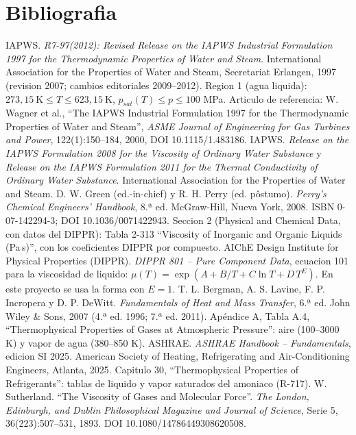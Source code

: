 \documentclass[11pt,a4paper]{article}
\begin{document}
\section{Bibliografia}
\begin{enumerate}[label={[\arabic*]}, leftmargin=1.6em]
 IAPWS. \emph{R7-97(2012): Revised Release on the IAPWS Industrial Formulation 1997 for the Thermodynamic Properties of Water and Steam}. International Association for the Properties of Water and Steam, Secretariat Erlangen, 1997 (revision 2007; cambios editoriales 2009--2012). Region 1 (agua liquida): $273{,}15\ \mathrm{K} \le T \le 623{,}15\ \mathrm{K}$, $p_{sat}(T) \le p \le 100$ MPa. Articulo de referencia: W. Wagner et al., ``The IAPWS Industrial Formulation 1997 for the Thermodynamic Properties of Water and Steam'', \emph{ASME Journal of Engineering for Gas Turbines and Power}, 122(1):150--184, 2000, DOI 10.1115/1.483186.
 IAPWS. \emph{Release on the IAPWS Formulation 2008 for the Viscosity of Ordinary Water Substance} y \emph{Release on the IAPWS Formulation 2011 for the Thermal Conductivity of Ordinary Water Substance}. International Association for the Properties of Water and Steam.
 D. W. Green (ed.-in-chief) y R. H. Perry (ed. p\^ostumo). \emph{Perry's Chemical Engineers' Handbook}, 8.ª ed. McGraw-Hill, Nueva York, 2008. ISBN 0-07-142294-3; DOI 10.1036/0071422943. Seccion 2 (Physical and Chemical Data, con datos del DIPPR): Tabla 2-313 ``Viscosity of Inorganic and Organic Liquids (Pa\,s)'', con los coeficientes DIPPR por compuesto.
 AIChE Design Institute for Physical Properties (DIPPR). \emph{DIPPR 801 -- Pure Component Data}, ecuacion 101 para la viscosidad de liquido: $\mu(T)=\exp\left(A+B/T+C\ln T+D\,T^{E}\right)$. En este proyecto se usa la forma con $E=1$.
 T. L. Bergman, A. S. Lavine, F. P. Incropera y D. P. DeWitt. \emph{Fundamentals of Heat and Mass Transfer}, 6.ª ed. John Wiley \& Sons, 2007 (4.ª ed. 1996; 7.ª ed. 2011). Apéndice A, Tabla A.4, ``Thermophysical Properties of Gases at Atmospheric Pressure'': aire (100--3000 K) y vapor de agua (380--850 K).
 ASHRAE. \emph{ASHRAE Handbook -- Fundamentals}, edicion SI 2025. American Society of Heating, Refrigerating and Air-Conditioning Engineers, Atlanta, 2025. Capitulo 30, ``Thermophysical Properties of Refrigerants'': tablas de liquido y vapor saturados del amoniaco (R-717).
 W. Sutherland. ``The Viscosity of Gases and Molecular Force''. \emph{The London, Edinburgh, and Dublin Philosophical Magazine and Journal of Science}, Serie 5, 36(223):507--531, 1893. DOI 10.1080/14786449308620508.

\end{enumerate}
\end{document}
